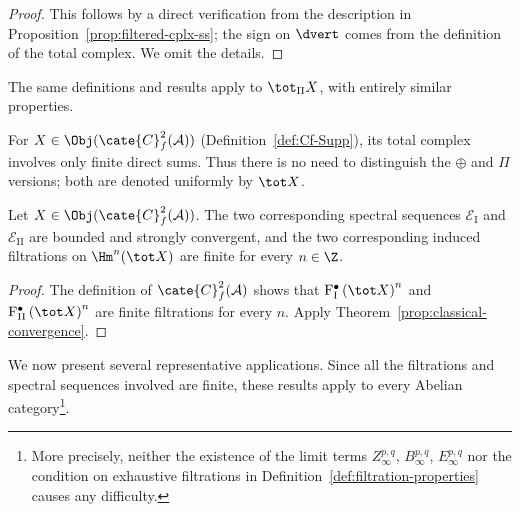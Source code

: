 \begin{proof}
	This follows by a direct verification from the description in
	Proposition~\ref{prop:filtered-cplx-ss}; the sign on $\dvert$ comes from the
	definition of the total complex. We omit the details.
\end{proof}

The same definitions and results apply to $\tot_{\Pi}X$, with entirely
similar properties.

For $X\in\Obj(\cate{C}^2_f(\mathcal{A}))$
(Definition~\ref{def:Cf-Supp}), its total complex involves only finite direct
sums. Thus there is no need to distinguish the $\oplus$ and $\Pi$ versions;
both are denoted uniformly by $\tot X$.

\begin{theorem}\label{prop:tot-ss}
	Let $X\in\Obj(\cate{C}^2_f(\mathcal{A}))$. The two corresponding spectral
	sequences $\mathscr{E}_{\mathrm{I}}$ and $\mathscr{E}_{\mathrm{II}}$ are
	bounded and strongly convergent, and the two corresponding induced
	filtrations on $\Hm^n(\tot X)$ are finite for every $n\in\Z$.
\end{theorem}
\begin{proof}
	The definition of $\cate{C}^2_f(\mathcal{A})$ shows that
	$\mathrm{F}_{\mathrm{I}}^\bullet\left(\tot X\right)^n$ and
	$\mathrm{F}_{\mathrm{II}}^\bullet\left(\tot X\right)^n$ are finite
	filtrations for every $n$. Apply
	Theorem~\ref{prop:classical-convergence}.
\end{proof}

We now present several representative applications. Since all the filtrations
and spectral sequences involved are finite, these results apply to every
Abelian category\footnote{More precisely, neither the existence of the limit
terms $Z_\infty^{p,q}$, $B_\infty^{p,q}$, $E_\infty^{p,q}$ nor the condition
on exhaustive filtrations in Definition~\ref{def:filtration-properties}
causes any difficulty.}.

